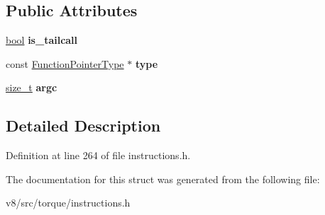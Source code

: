 \subsection*{Public Attributes}
\begin{DoxyCompactItemize}
\item 
\mbox{\label{structv8_1_1internal_1_1torque_1_1CallBuiltinPointerInstruction_a6c702f0517cb006f32ee5bdf0f439748}} 
\mbox{\hyperlink{classbool}{bool}} {\bfseries is\+\_\+tailcall}
\item 
\mbox{\label{structv8_1_1internal_1_1torque_1_1CallBuiltinPointerInstruction_a35d35dc0a186dfc41fe3429e074a675e}} 
const \mbox{\hyperlink{classv8_1_1internal_1_1torque_1_1FunctionPointerType}{Function\+Pointer\+Type}} $\ast$ {\bfseries type}
\item 
\mbox{\label{structv8_1_1internal_1_1torque_1_1CallBuiltinPointerInstruction_a951109dae68d40489258798ebc7119fb}} 
\mbox{\hyperlink{classsize__t}{size\+\_\+t}} {\bfseries argc}
\end{DoxyCompactItemize}


\subsection{Detailed Description}


Definition at line 264 of file instructions.\+h.



The documentation for this struct was generated from the following file\+:\begin{DoxyCompactItemize}
\item 
v8/src/torque/instructions.\+h\end{DoxyCompactItemize}
